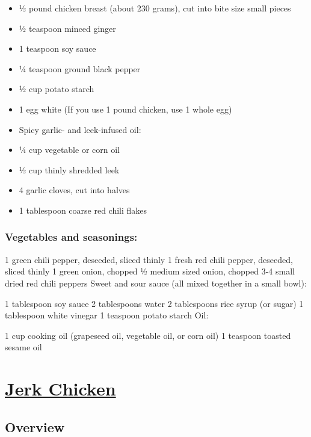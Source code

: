 \documentclass[]{article}
\begin{document}
\begin{itemize}
\item
  ½ pound chicken breast (about 230 grams), cut into bite size small pieces
\item
  ½ teaspoon minced ginger
\item
  1 teaspoon soy sauce
\item
  ¼ teaspoon ground black pepper
\item
  ½ cup potato starch
\item
  1 egg white (If you use 1 pound chicken, use 1 whole egg)
\item
  Spicy garlic- and leek-infused oil:
\item
  ¼ cup vegetable or corn oil
\item
  ½ cup thinly shredded leek
\item
  4 garlic cloves, cut into halves
\item
  1 tablespoon coarse red chili flakes
\end{itemize}

\hypertarget{vegetables-and-seasonings}{%
\subsubsection{Vegetables and seasonings:}\label{vegetables-and-seasonings}}

1 green chili pepper, deseeded, sliced thinly
1 fresh red chili pepper, deseeded, sliced thinly
1 green onion, chopped
½ medium sized onion, chopped
3-4 small dried red chili peppers
Sweet and sour sauce (all mixed together in a small bowl):

1 tablespoon soy sauce
2 tablespoons water
2 tablespoons rice syrup (or sugar)
1 tablespoon white vinegar
1 teaspoon potato starch
Oil:

1 cup cooking oil (grapeseed oil, vegetable oil, or corn oil)
1 teaspoon toasted sesame oil

\hypertarget{jerk-chicken}{%
\section{\texorpdfstring{\href{https://www.seriouseats.com/recipes/2013/08/jerk-chicken.html}{Jerk Chicken}}{Jerk Chicken}}\label{jerk-chicken}}

\hypertarget{overview}{%
\subsection{Overview}\label{overview}}
\end{document}
